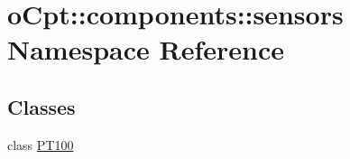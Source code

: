 \hypertarget{namespaceo_cpt_1_1components_1_1sensors}{}\section{o\+Cpt\+:\+:components\+:\+:sensors Namespace Reference}
\label{namespaceo_cpt_1_1components_1_1sensors}
\subsection*{Classes}
\begin{DoxyCompactItemize}
\item 
class \hyperlink{classo_cpt_1_1components_1_1sensors_1_1_p_t100}{P\+T100}
\end{DoxyCompactItemize}
